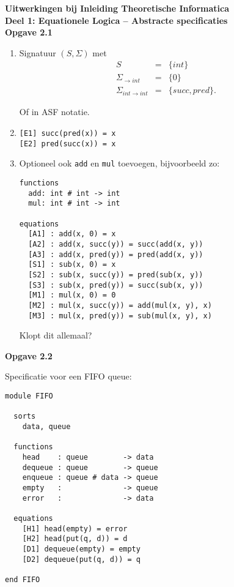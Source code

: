 \documentclass[a4paper,11pt]{article}
\begin{document}
{\bf Uitwerkingen bij Inleiding Theoretische Informatica\\
Deel 1: Equationele Logica -- Abstracte specificaties}\\[2em]


{\bf Opgave 2.1}

\begin{enumerate}

\item %
Signatuur $(S, \Sigma)$ met
\begin{eqnarray*}
S & = & \{int\}                                     \\
\Sigma_{\rightarrow int} & = & \{0\}               \\
\Sigma_{int \rightarrow int} & = & \{succ, pred\}.
\end{eqnarray*}

Of in ASF notatie.

\item %
\begin{verbatim}
[E1] succ(pred(x)) = x
[E2] pred(succ(x)) = x
\end{verbatim}

\item Optioneel ook \verb|add| en \verb|mul| toevoegen, bijvoorbeeld zo:

\begin{verbatim}
functions
  add: int # int -> int
  mul: int # int -> int

equations
  [A1] : add(x, 0) = x
  [A2] : add(x, succ(y)) = succ(add(x, y))
  [A3] : add(x, pred(y)) = pred(add(x, y))
  [S1] : sub(x, 0) = x
  [S2] : sub(x, succ(y)) = pred(sub(x, y))
  [S3] : sub(x, pred(y)) = succ(sub(x, y))
  [M1] : mul(x, 0) = 0
  [M2] : mul(x, succ(y)) = add(mul(x, y), x)
  [M3] : mul(x, pred(y)) = sub(mul(x, y), x)
\end{verbatim}

Klopt dit allemaal?

\end{enumerate}


{\bf Opgave 2.2}

Specificatie voor een FIFO queue:

\begin{verbatim}
module FIFO

  sorts
    data, queue

  functions
    head    : queue        -> data
    dequeue : queue        -> queue
    enqueue : queue # data -> queue
    empty   :              -> queue
    error   :              -> data

  equations
    [H1] head(empty) = error
    [H2] head(put(q, d)) = d
    [D1] dequeue(empty) = empty
    [D2] dequeue(put(q, d)) = q

end FIFO
\end{verbatim}
\end{document}
